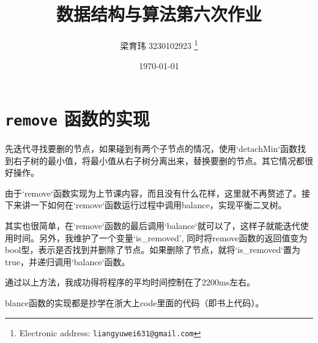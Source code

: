 \documentclass[UTF8]{ctexart}
\begin{document}
\pagestyle{fancy}
\fancyhead{}
\rhead{\today}
\title{数据结构与算法第六次作业}

\author{梁育玮 3230102923
  \thanks{Electronic address: \texttt{liangyuwei631@gmail.com}}}


\date{\today}

\maketitle

\section{\texttt{remove} 函数的实现}
先迭代寻找要删的节点，如果碰到有两个子节点的情况，使用`detachMin`函数找到右子树的最小值，将最小值从右子树分离出来，替换要删的节点。其它情况都很好操作。

由于`remove`函数实现为上节课内容，而且没有什么花样，这里就不再赘述了。接下来讲一下如何在`remove`函数运行过程中调用balance，实现平衡二叉树。

其实也很简单，在`remove`函数的最后调用`balance`就可以了，这样子就能迭代使用时间。另外，我维护了一个变量`is\_removed', 同时将remove函数的返回值变为bool型，表示是否找到并删除了节点。如果删除了节点，就将`is\_removed`置为true，并递归调用`balance`函数。

通过以上方法，我成功得将程序的平均时间控制在了2200ms左右。

blance函数的实现都是抄学在浙大上code里面的代码（即书上代码）。
\end{document}
